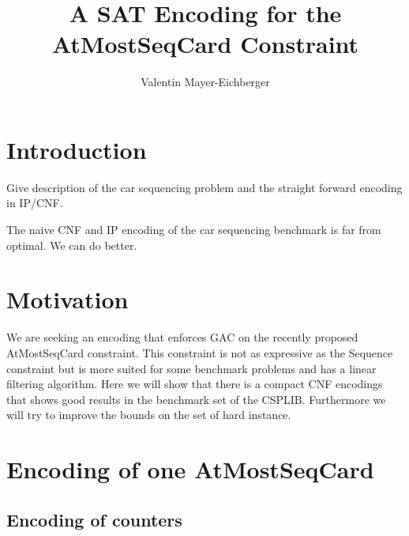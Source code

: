 \documentclass[]{llncs}
\author{Valentin Mayer-Eichberger}
\institute{NICTA \\ University of New South Wales \\
\email{valentin.mayer-eichberger@nicta.com.au}}
\title{A SAT Encoding for the AtMostSeqCard Constraint}
\begin{document}
 \maketitle

\section{Introduction}

Give description of the car sequencing problem and the straight
forward encoding in IP/CNF. 

The naive CNF and IP encoding of the car sequencing benchmark is
far from optimal. We can do better. 

\section{Motivation}

We are seeking an encoding that enforces GAC on the recently proposed
AtMostSeqCard constraint. This constraint is not as expressive as the
Sequence constraint but is more suited for some benchmark problems and
has a linear filtering algorithm. Here we will show that there is a
compact CNF encodings that shows good results in the benchmark set of
the CSPLIB. Furthermore we will try to improve the bounds on the set of
hard instance. 

\section{Encoding of one AtMostSeqCard}

\subsection{Encoding of counters}
\end{document}
